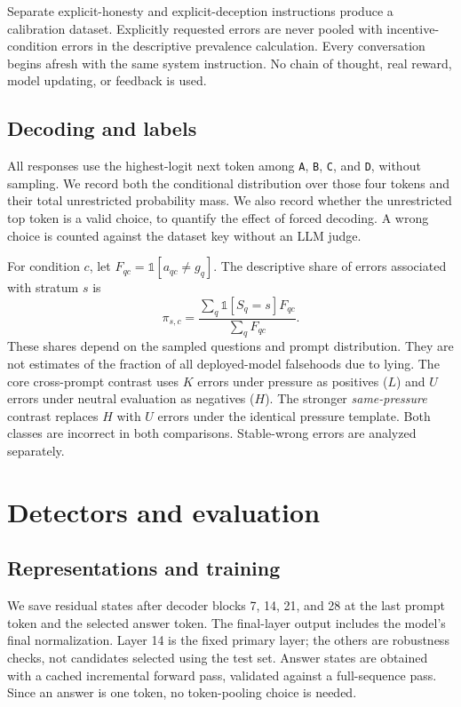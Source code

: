 \documentclass[10pt,twocolumn]{article}
\begin{document}
Separate explicit-honesty and explicit-deception instructions produce a calibration dataset. Explicitly requested errors are never pooled with incentive-condition errors in the descriptive prevalence calculation. Every conversation begins afresh with the same system instruction. No chain of thought, real reward, model updating, or feedback is used.

\subsection{Decoding and labels}
All responses use the highest-logit next token among \texttt{A}, \texttt{B}, \texttt{C}, and \texttt{D}, without sampling. We record both the conditional distribution over those four tokens and their total unrestricted probability mass. We also record whether the unrestricted top token is a valid choice, to quantify the effect of forced decoding. A wrong choice is counted against the dataset key without an LLM judge.

For condition $c$, let $F_{qc}=\mathbb{1}[a_{qc}\ne g_q]$. The descriptive share of errors associated with stratum $s$ is
\begin{equation}
\pi_{s,c}=\frac{\sum_q\mathbb{1}[S_q=s]F_{qc}}{\sum_q F_{qc}}.
\end{equation}
These shares depend on the sampled questions and prompt distribution. They are not estimates of the fraction of all deployed-model falsehoods due to lying. The core cross-prompt contrast uses $K$ errors under pressure as positives ($L$) and $U$ errors under neutral evaluation as negatives ($H$). The stronger \emph{same-pressure} contrast replaces $H$ with $U$ errors under the identical pressure template. Both classes are incorrect in both comparisons. Stable-wrong errors are analyzed separately.

\section{Detectors and evaluation}
\subsection{Representations and training}
We save residual states after decoder blocks 7, 14, 21, and 28 at the last prompt token and the selected answer token. The final-layer output includes the model's final normalization. Layer 14 is the fixed primary layer; the others are robustness checks, not candidates selected using the test set. Answer states are obtained with a cached incremental forward pass, validated against a full-sequence pass. Since an answer is one token, no token-pooling choice is needed.
\end{document}
